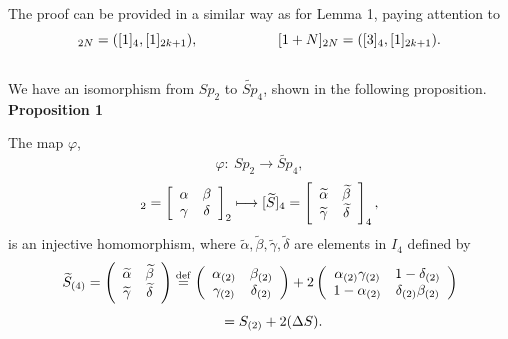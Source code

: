 \documentclass[12pt]{iopart}
\newcommand{\deq}{\stackrel{\rm{\tiny def}}{=}}
\begin{document}
The proof can be provided in a similar way as for Lemma 1, paying attention to
\begin{equation}
[1]_{2N}=([1]_4,[1]_{2k+1}),
\hspace{20mm}
[1+N]_{2N}=([3]_4,[1]_{2k+1}).
\end{equation}
\ \\

We have an isomorphism from \(Sp_2\) to \(\widetilde{Sp}_4\), shown in the following proposition.
\\

\noindent
{\bf Proposition 1}
\vspace{2mm}

The map \(\varphi\),
\begin{equation}
\varphi:\ Sp_2\longrightarrow\widetilde{Sp}_4,
\end{equation}
\begin{equation}
[S]_2=
\left[\begin{array}{cc}
\alpha&\beta\\\relax
\gamma&\delta\\
\end{array}\right]_2
\longmapsto
[\widetilde S]_4=
\left[\begin{array}{cc}
\widetilde\alpha&\widetilde\beta\\\relax
\widetilde\gamma&\widetilde\delta\\
\end{array}\right]_4,
\end{equation}
is an injective homomorphism, where \(\widetilde\alpha,\widetilde\beta,\widetilde\gamma,\widetilde\delta\) are elements in \(I_4\)
defined by
\[
\widetilde S_{(4)}=
\left(\begin{array}{cc}\widetilde\alpha&\widetilde\beta\\\widetilde\gamma&\widetilde\delta\\\end{array}\right)
\deq
\left(\begin{array}{cc}\alpha_{(2)}&\beta_{(2)}\\\gamma_{(2)}&\delta_{(2)}\\\end{array}\right)
+
2\left(\begin{array}{cc}\alpha_{(2)}\gamma_{(2)}&1-\delta_{(2)}\\1-\alpha_{(2)}&\delta_{(2)}\beta_{(2)}\\\end{array}\right)
\]
\begin{equation}
\hspace{7mm}
=S_{(2)}+2(\Delta S).
\end{equation}
\ \\
\end{document}
